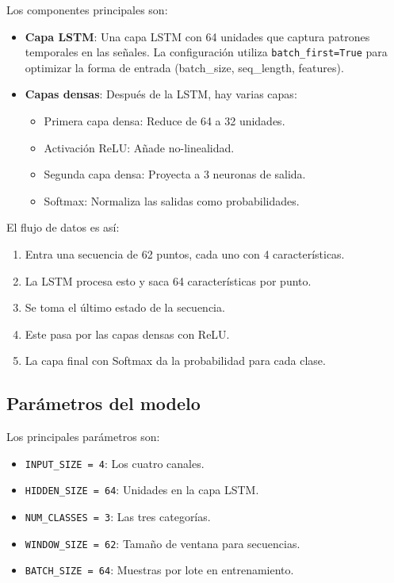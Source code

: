Los componentes principales son:

\begin{itemize}
    \item \textbf{Capa LSTM}: Una capa LSTM con 64 unidades que captura patrones temporales en las señales. La configuración utiliza \texttt{batch\_first=True} para optimizar la forma de entrada (batch\_size, seq\_length, features).
    
    \item \textbf{Capas densas}: Después de la LSTM, hay varias capas:
    \begin{itemize}
        \item Primera capa densa: Reduce de 64 a 32 unidades.
        \item Activación ReLU: Añade no-linealidad.
        \item Segunda capa densa: Proyecta a 3 neuronas de salida.
        \item Softmax: Normaliza las salidas como probabilidades.
    \end{itemize}
\end{itemize}

El flujo de datos es así:

\begin{enumerate}
    \item Entra una secuencia de 62 puntos, cada uno con 4 características.
    \item La LSTM procesa esto y saca 64 características por punto.
    \item Se toma el último estado de la secuencia.
    \item Este pasa por las capas densas con ReLU.
    \item La capa final con Softmax da la probabilidad para cada clase.
\end{enumerate}

\subsection{Parámetros del modelo}

Los principales parámetros son:

\begin{itemize}
    \item \texttt{INPUT\_SIZE = 4}: Los cuatro canales.
    \item \texttt{HIDDEN\_SIZE = 64}: Unidades en la capa LSTM.
    \item \texttt{NUM\_CLASSES = 3}: Las tres categorías.
    \item \texttt{WINDOW\_SIZE = 62}: Tamaño de ventana para secuencias.
    \item \texttt{BATCH\_SIZE = 64}: Muestras por lote en entrenamiento.
\end{itemize}

